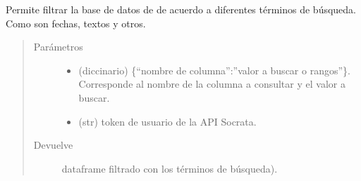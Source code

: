 \documentclass[letterpaper,10pt,openany,spanish]{sphinxmanual}
\begin{document}
\begin{fulllineitems}
\label{\detokenize{metadatos:metadatos.filtrar_asset}}
Permite filtrar la base de datos de  de acuerdo a diferentes términos de búsqueda. Como son fechas, textos y otros.
\begin{quote}\begin{description}
\item[{Parámetros}] \leavevmode\begin{itemize}
\item {} 
 \textendash{} (diccinario) \{“nombre de columna”:”valor a buscar o rangos”\}. Corresponde al nombre de la columna a consultar y el valor a buscar.

\item {} 
 \textendash{} (str)  \sphinxhyphen{} token de usuario de la API Socrata.

\end{itemize}

\item[{Devuelve}] \leavevmode
dataframe  filtrado con los términos de búsqueda).

\end{description}\end{quote}

\end{fulllineitems}

\end{document}
